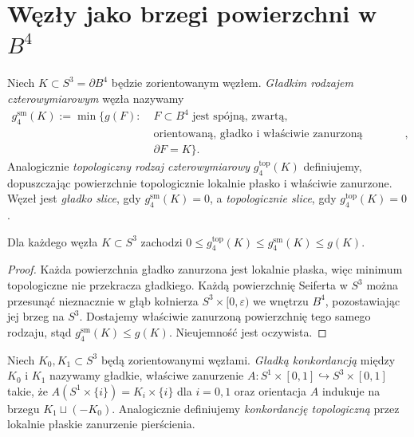 \section{Węzły jako brzegi powierzchni w \texorpdfstring{$B^4$}{B4}}
\label{sec:kt-slice}

\begin{definicja}
Niech $K\subset S^3=\partial B^4$ będzie zorientowanym węzłem.
\emph{Gładkim rodzajem czterowymiarowym} węzła nazywamy
\[
\begin{aligned}
g_4^{\mathrm{sm}}(K):=\min\big\{g(F):\;&F\subset B^4
\text{ jest spójną, zwartą,}\\
&\text{orientowaną, gładko i właściwie zanurzoną powierzchnią},\\
&\partial F=K\big\}.
\end{aligned}
\]
Analogicznie \emph{topologiczny rodzaj czterowymiarowy}
$g_4^{\mathrm{top}}(K)$ definiujemy, dopuszczając powierzchnie
topologicznie lokalnie płasko i właściwie zanurzone.
Węzeł jest \emph{gładko slice}, gdy $g_4^{\mathrm{sm}}(K)=0$,
a \emph{topologicznie slice}, gdy $g_4^{\mathrm{top}}(K)=0$.
\end{definicja}

\begin{stwierdzenie}
Dla każdego węzła $K\subset S^3$ zachodzi
$0\leq g_4^{\mathrm{top}}(K)\leq g_4^{\mathrm{sm}}(K)\leq g(K)$.
\end{stwierdzenie}

\begin{proof}
Każda powierzchnia gładko zanurzona jest lokalnie płaska,
więc minimum topologiczne nie przekracza gładkiego.
Każdą powierzchnię Seiferta w $S^3$ można przesunąć
nieznacznie w głąb kołnierza $S^3\times[0,\varepsilon)$
we wnętrzu $B^4$, pozostawiając jej brzeg na $S^3$.
Dostajemy właściwie zanurzoną powierzchnię tego samego
rodzaju, stąd $g_4^{\mathrm{sm}}(K)\leq g(K)$.
Nieujemność jest oczywista.
\end{proof}

\begin{definicja}
Niech $K_0,K_1\subset S^3$ będą zorientowanymi węzłami.
\emph{Gładką konkordancją} między $K_0$ i $K_1$ nazywamy
gładkie, właściwe zanurzenie
$A\colon S^1\times[0,1]\hookrightarrow S^3\times[0,1]$
takie, że $A(S^1\times\{i\})=K_i\times\{i\}$ dla $i=0,1$
oraz orientacja $A$ indukuje na brzegu $K_1\sqcup(-K_0)$.
Analogicznie definiujemy \emph{konkordancję topologiczną}
przez lokalnie płaskie zanurzenie pierścienia.
\end{definicja}


